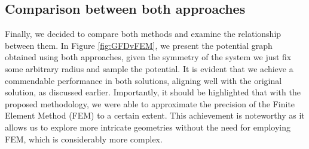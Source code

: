 \documentclass{PoS}
\begin{document}

\subsection{Comparison between both approaches}

Finally, we decided to compare both methods and examine the relationship between them. In Figure \ref{fig:GFDvFEM}, we present the potential graph obtained using both approaches, given the symmetry of the system we just fix some arbitrary radius and sample the potential. It is evident that we achieve a commendable performance in both solutions, aligning well with the original solution, as discussed earlier. Importantly, it should be highlighted that with the proposed methodology, we were able to approximate the precision of the Finite Element Method (FEM) to a certain extent. This achievement is noteworthy as it allows us to explore more intricate geometries without the need for employing FEM, which is considerably more complex.
\end{document}
